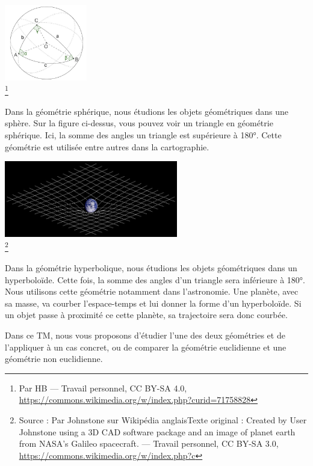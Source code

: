 \documentclass[
  10pt,
  french,
  a5paper,
  openany]{book}
\begin{document}
\begin{center}
\includegraphics[width=\textwidth,height=9em]{images/la-geometrie-non-euclidienne-2.jpg}\\
\footnote{Par HB --- Travail personnel, CC BY-SA 4.0, \url{https://commons.wikimedia.org/w/index.php?curid=71758828}}

\end{center}

Dans la géométrie sphérique, nous étudions les objets géométriques dans une sphère. Sur la figure ci-dessus, vous pouvez voir un triangle en géométrie sphérique. Ici, la somme des angles un triangle est supérieure à 180°. Cette géométrie est utilisée entre autres dans la cartographie.

\begin{center}
\includegraphics[width=\textwidth,height=9em]{images/la-geometrie-non-euclidienne-3.jpg}\\
\footnote{Source : Par Johnstone sur Wikipédia anglaisTexte original : Created by User Johnstone using a 3D CAD software package and an image of planet earth from NASA's Galileo spacecraft. --- Travail personnel, CC BY-SA 3.0, \url{https://commons.wikimedia.org/w/index.php?c}}

\end{center}

Dans la géométrie hyperbolique, nous étudions les objets géométriques dans un hyperboloïde. Cette fois, la somme des angles d'un triangle sera inférieure à 180°. Nous utilisons cette géométrie notamment dans l'astronomie. Une planète, avec sa masse, va courber l'espace-temps et lui donner la forme d'un hyperboloïde. Si un objet passe à proximité ce cette planète, sa trajectoire sera donc courbée.

\clearpage

Dans ce TM, nous vous proposons d'étudier l'une des deux géométries et de l'appliquer à un cas concret, ou de comparer la géométrie euclidienne et une géométrie non euclidienne.
\end{document}
